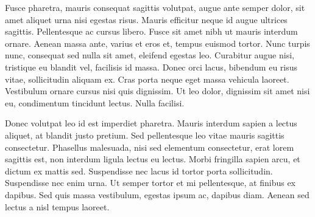 \documentclass[10pt,a4paper]{article}
\begin{document}
\pagestyle{fancy}
\rfoot{\thepage}
\cfoot{}

\preamble

\lstset{language=C,
        basicstyle=\small\ttfamily, keywordstyle=\bfseries,
        identifierstyle=\sffamily, stringstyle=\itshape,
    commentstyle=\itshape, showstringspaces=true,escapeinside=`'}

\questsection
 Fusce pharetra, mauris consequat sagittis volutpat, augue ante semper dolor, sit amet aliquet urna nisi egestas risus. Mauris efficitur neque id augue ultrices sagittis. Pellentesque ac cursus libero. Fusce sit amet nibh ut mauris interdum ornare. Aenean massa ante, varius et eros et, tempus euismod tortor. Nunc turpis nunc, consequat sed nulla sit amet, eleifend egestas leo. Curabitur augue nisi, tristique eu blandit vel, facilisis id massa. Donec orci lacus, bibendum eu risus vitae, sollicitudin aliquam ex. Cras porta neque eget massa vehicula laoreet. Vestibulum ornare cursus nisi quis dignissim. Ut leo dolor, dignissim sit amet nisi eu, condimentum tincidunt lectus. Nulla facilisi.\\


\questsection
Donec volutpat leo id est imperdiet pharetra. Mauris interdum sapien a lectus aliquet, at blandit justo pretium. Sed pellentesque leo vitae mauris sagittis consectetur. Phasellus malesuada, nisi sed elementum consectetur, erat lorem sagittis est, non interdum ligula lectus eu lectus. Morbi fringilla sapien arcu, et dictum ex mattis sed. Suspendisse nec lacus id tortor porta sollicitudin. Suspendisse nec enim urna. Ut semper tortor et mi pellentesque, at finibus ex dapibus. Sed quis massa vestibulum, egestas ipsum ac, dapibus diam. Aenean sed lectus a nisl tempus laoreet. \\

\end{document}
